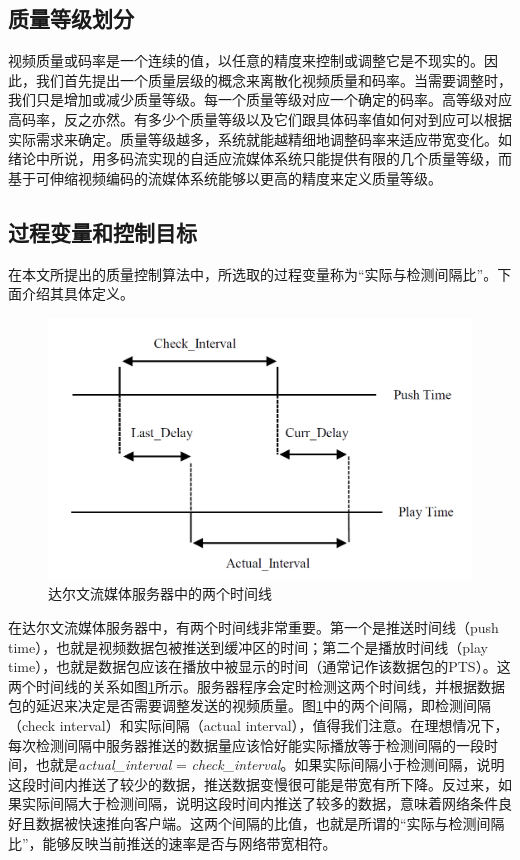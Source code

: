 \subsection{质量等级划分}

视频质量或码率是一个连续的值，以任意的精度来控制或调整它是不现实的。因此，我们首先提出一个质量层级的概念来离散化视频质量和码率。当需要调整时，我们只是增加或减少质量等级。每一个质量等级对应一个确定的码率。高等级对应高码率，反之亦然。有多少个质量等级以及它们跟具体码率值如何对到应可以根据实际需求来确定。质量等级越多，系统就能越精细地调整码率来适应带宽变化。如绪论中所说，用多码流实现的自适应流媒体系统只能提供有限的几个质量等级，而基于可伸缩视频编码的流媒体系统能够以更高的精度来定义质量等级。

\subsection{过程变量和控制目标}

在本文所提出的质量控制算法中，所选取的过程变量称为“实际与检测间隔比”。下面介绍其具体定义。

\begin{figure}[h]
	\centering
	\includegraphics[width = 0.9\linewidth]{figures/Intervals.png}
	\caption{达尔文流媒体服务器中的两个时间线 \label{fig:intervals}}
\end{figure}

在达尔文流媒体服务器中，有两个时间线非常重要。第一个是推送时间线（push time），也就是视频数据包被推送到缓冲区的时间；第二个是播放时间线（play time），也就是数据包应该在播放中被显示的时间（通常记作该数据包的PTS）。这两个时间线的关系如图\ref{fig:intervals}所示。服务器程序会定时检测这两个时间线，并根据数据包的延迟来决定是否需要调整发送的视频质量。图\ref{fig:intervals}中的两个间隔，即检测间隔（check interval）和实际间隔（actual interval），值得我们注意。在理想情况下，每次检测间隔中服务器推送的数据量应该恰好能实际播放等于检测间隔的一段时间，也就是\textit{actual\_interval} = \textit{check\_interval}。如果实际间隔小于检测间隔，说明这段时间内推送了较少的数据，推送数据变慢很可能是带宽有所下降。反过来，如果实际间隔大于检测间隔，说明这段时间内推送了较多的数据，意味着网络条件良好且数据被快速推向客户端。这两个间隔的比值，也就是所谓的“实际与检测间隔比”，能够反映当前推送的速率是否与网络带宽相符。

